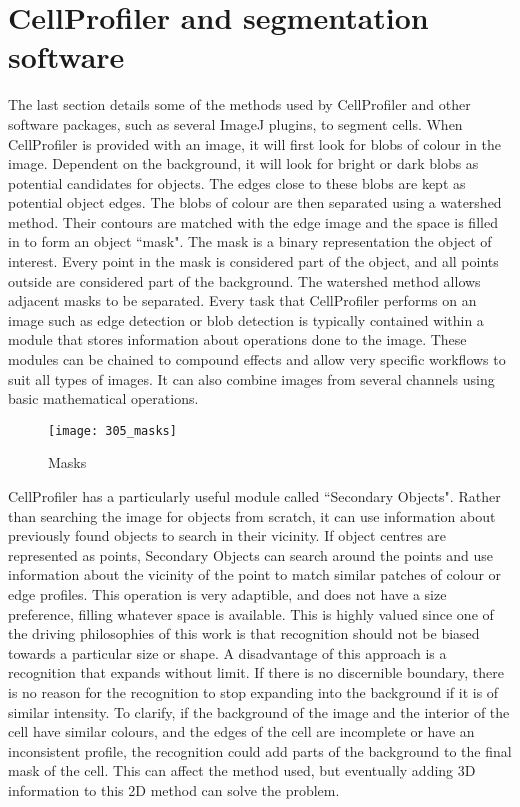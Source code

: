 \section{CellProfiler and segmentation software}

The last section details some of the methods used by CellProfiler and other software packages, such as several ImageJ plugins, to segment cells. When CellProfiler is provided with an image, it will first look for blobs of colour in the image. Dependent on the background, it will look for bright or dark blobs as potential candidates for objects. The edges close to these blobs are kept as potential object edges. The blobs of colour are then separated using a watershed method. Their contours are matched with the edge image and the space is filled in to form an object ``mask". The mask is a binary representation the object of interest. Every point in the mask is considered part of the object, and all points outside are considered part of the background. The watershed method allows adjacent masks to be separated. Every task that CellProfiler performs on an image such as edge detection or blob detection is typically contained within a module that stores information about operations done to the image. These modules can be chained to compound effects and allow very specific workflows to suit all types of images. It can also combine images from several channels using basic mathematical operations.

\begin{figure}[p]
 \centering
 \texttt{[image: 305\_masks]}
 \caption{
 	Masks
 }
 \label{fig:masks}
\end{figure}

CellProfiler has a particularly useful module called ``Secondary Objects". Rather than searching the image for objects from scratch, it can use information about previously found objects to search in their vicinity. If object centres are represented as points, Secondary Objects can search around the points and use information about the vicinity of the point to match similar patches of colour or edge profiles. This operation is very adaptible, and does not have a size preference, filling whatever space is available. This is highly valued since one of the driving philosophies of this work is that recognition should not be biased towards a particular size or shape. A disadvantage of this approach is a recognition that expands without limit. If there is no discernible boundary, there is no reason for the recognition to stop expanding into the background if it is of similar intensity. To clarify, if the background of the image and the interior of the cell have similar colours, and the edges of the cell are incomplete or have an inconsistent profile, the recognition could add parts of the background to the final mask of the cell. This can affect the method used, but eventually adding 3D information to this 2D method can solve the problem.

